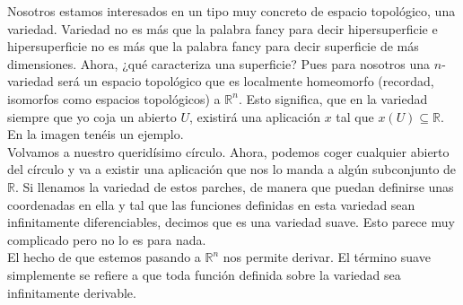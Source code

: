 \documentclass[12pt]{article}
\begin{document}
Nosotros estamos interesados en un tipo muy concreto de espacio topológico, una variedad. Variedad no es más que la palabra fancy para decir hipersuperficie e hipersuperficie no es más que la palabra fancy para decir superficie de más dimensiones. Ahora, ¿qué caracteriza una superficie? Pues para nosotros una $n$- variedad será un espacio topológico que es localmente homeomorfo (recordad, isomorfos como espacios topológicos) a $\mathbb{R}^n$. Esto significa, que en la variedad siempre que yo coja un abierto $U$, existirá una aplicación $x$ tal que $x(U)\subseteq \mathbb{R}$. En la imagen tenéis un ejemplo.  \\
Volvamos a nuestro queridísimo círculo. Ahora, podemos coger cualquier abierto del círculo y va a existir una aplicación que nos lo manda a algún subconjunto de $\mathbb{R}$. Si llenamos la variedad de estos parches, de manera que puedan definirse unas coordenadas en ella y tal que las funciones definidas en esta variedad sean infinitamente diferenciables, decimos que es una variedad suave. Esto parece muy complicado pero no lo es para nada. \\ 

El hecho de que estemos pasando a $\mathbb{R}^n$ nos permite derivar. El término suave simplemente se refiere a que toda función definida sobre la variedad sea infinitamente derivable.\\\\
\end{document}
